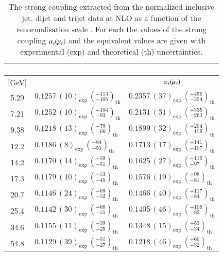 \documentclass[12pt]{article}
\begin{document}
\begin{table}
  \scriptsize
  \center
  \begin{tabular}{c | l | l}
\multicolumn{3}{c}{\bf \begin{boldmath}\end{boldmath}} \\
\hline
\mur{} [GeV] & \multicolumn{1}{c|}{\asmz{}} & \multicolumn{1}{c}{$\alpha_{\rm s}(\mu_r)$} \\
\hline
 5.29 & $0.1257\,(10)_{\text{exp}}\,({}^{+113}_{-105})_{\text{th}}$ & $0.2357\,(37)_{\text{exp}}\,({}^{+456}_{-354})_{\text{th}}$ \\
 7.21 & $0.1252\,(10)_{\text{exp}}\,({}^{+104}_{-93})_{\text{th}}$ & $0.2131\,(31)_{\text{exp}}\,({}^{+335}_{-263})_{\text{th}}$ \\
 9.38 & $0.1218\,(13)_{\text{exp}}\,({}^{+79}_{-66})_{\text{th}}$ & $0.1899\,(32)_{\text{exp}}\,({}^{+204}_{-159})_{\text{th}}$ \\
 12.2 & $0.1186\,(8)_{\text{exp}}\,({}^{+64}_{-51})_{\text{th}}$ & $0.1713\,(17)_{\text{exp}}\,({}^{+141}_{-107})_{\text{th}}$ \\
 14.2 & $0.1170\,(14)_{\text{exp}}\,({}^{+59}_{-51})_{\text{th}}$ & $0.1625\,(27)_{\text{exp}}\,({}^{+119}_{-97})_{\text{th}}$ \\
 17.3 & $0.1179\,(10)_{\text{exp}}\,({}^{+53}_{-45})_{\text{th}}$ & $0.1576\,(19)_{\text{exp}}\,({}^{+98}_{-81})_{\text{th}}$ \\
 20.7 & $0.1146\,(24)_{\text{exp}}\,({}^{+69}_{-52})_{\text{th}}$ & $0.1466\,(40)_{\text{exp}}\,({}^{+117}_{-84})_{\text{th}}$ \\
 25.4 & $0.1142\,(30)_{\text{exp}}\,({}^{+68}_{-55})_{\text{th}}$ & $0.1405\,(46)_{\text{exp}}\,({}^{+106}_{-82})_{\text{th}}$ \\
 34.6 & $0.1155\,(11)_{\text{exp}}\,({}^{+39}_{-25})_{\text{th}}$ & $0.1348\,(15)_{\text{exp}}\,({}^{+53}_{-34})_{\text{th}}$ \\
 54.8 & $0.1129\,(39)_{\text{exp}}\,({}^{+51}_{-27})_{\text{th}}$ & $0.1218\,(46)_{\text{exp}}\,({}^{+60}_{-32})_{\text{th}}$ \\
\hline
  \end{tabular}
  \caption{The strong coupling extracted from the normalized inclusive jet, dijet and trijet data
    at NLO as a function of the renormalisation scale \mur{}. For each
    \mur{} the values of the strong coupling $\alpha_{\rm s}(\mu_r)$
    and the equivalent values \asmz{} are given with experimental
    (exp) and theoretical (th) uncertainties.
  }
  \label{tab:AlphasRunning}
\end{table}
\end{document}
